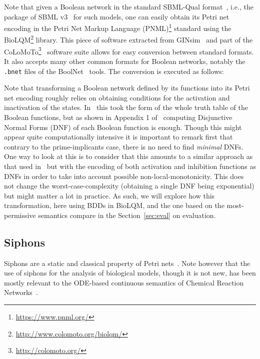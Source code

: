 \documentclass[preprint,12pt]{elsarticle}
\begin{document}
Note that given a Boolean network in the standard SBML-Qual format~\cite{chaouiya2013sbml}, i.e., the package of SBML v3~\cite{keating2020sbml} for such models, one can easily obtain its Petri net encoding in the Petri Net Markup Language  (PNML)\footnote{\url{https://www.pnml.org/}} standard using the BioLQM\footnote{\url{http://www.colomoto.org/biolqm/}} library.
This piece of software extracted from GINsim~\cite{chaouiya2012logical} and part of the CoLoMoTo\footnote{\url{http://colomoto.org/}}~\cite{naldi2015cooperative} software suite allows for easy conversion between standard formats.
It also accepts many other common formats for Boolean networks, notably the \verb|.bnet| files of the  BoolNet~\cite{mussel2010boolnet,klarner2017pyboolnet} tools.
The conversion is executed as follows:


Note that transforming a Boolean network defined by its functions into its Petri net encoding roughly relies on obtaining conditions for the activation and inactivation of the states. In~\cite{chaouiya2004qualitative} this took the form of the whole truth table of the Boolean functions, but as shown in Appendix 1 of~\cite{chatain2014characterization} computing Disjunctive Normal Forms (DNF) of each Boolean function is enough.
Though this might appear quite computationally intensive it is important to remark first that contrary to the prime-implicants case, there is no need to find \emph{minimal} DNFs.
One way to look at this is to consider that this amounts to a similar approach as that used in~\cite{DBLP:conf/ictai/ChevalierFPZ19} but with the encoding of both activation and inhibition functions as DNFs in order to take into account possible non-local-monotonicity.
This does not change the worst-case-complexity (obtaining a single DNF being exponential) but might matter a lot in practice.
As such, we will explore how this transformation, here using BDDs in BioLQM, and the one based on the most-permissive semantics compare in the Section~\ref{sec:eval} on evaluation.

\subsection{Siphons}

Siphons are a static and classical property of Petri nets~\cite{peterson1981petri}.
Note however that the use of siphons for the analysis of biological models, though it is not new, has been mostly relevant to the ODE-based continuous semantics of Chemical Reaction Networks~\cite{angeli2007petri,angeli2011persistence,degrand2020graphical}.
\end{document}
